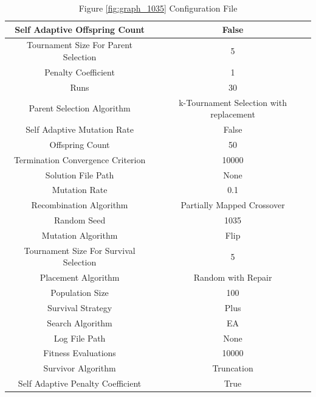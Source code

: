 \documentclass{standalone}
\begin{document}
\begin{table}[!htb]
	\centering
	\caption{Figure \ref{fig:graph_1035} Configuration File}
	\label{tab:graph_1035}
	\begin{tabular}{| c | c |}
		\hline
		Self Adaptive Offspring Count		& False		 \\
		\hline
		Tournament Size For Parent Selection		& 5		 \\
		\hline
		Penalty Coefficient		& 1		 \\
		\hline
		Runs		& 30		 \\
		\hline
		Parent Selection Algorithm		& k-Tournament Selection with replacement		 \\
		\hline
		Self Adaptive Mutation Rate		& False		 \\
		\hline
		Offspring Count		& 50		 \\
		\hline
		Termination Convergence Criterion		& 10000		 \\
		\hline
		Solution File Path		& None		 \\
		\hline
		Mutation Rate		& 0.1		 \\
		\hline
		Recombination Algorithm		& Partially Mapped Crossover		 \\
		\hline
		Random Seed		& 1035		 \\
		\hline
		Mutation Algorithm		& Flip		 \\
		\hline
		Tournament Size For Survival Selection		& 5		 \\
		\hline
		Placement Algorithm		& Random with Repair		 \\
		\hline
		Population Size		& 100		 \\
		\hline
		Survival Strategy		& Plus		 \\
		\hline
		Search Algorithm		& EA		 \\
		\hline
		Log File Path		& None		 \\
		\hline
		Fitness Evaluations		& 10000		 \\
		\hline
		Survivor Algorithm		& Truncation		 \\
		\hline
		Self Adaptive Penalty Coefficient		& True		 \\
		\hline
	\end{tabular}
\end{table}
\end{document}
